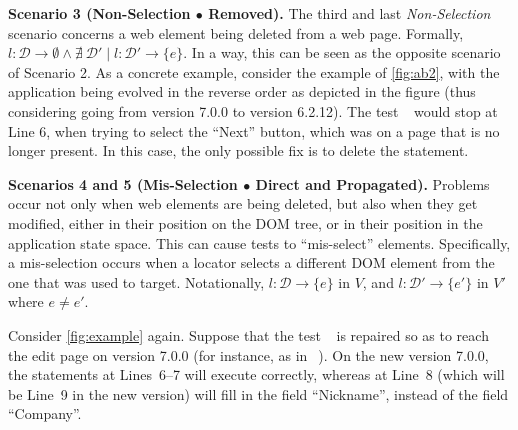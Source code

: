 \noindent
\textbf{Scenario 3 (Non-Selection $\bullet$ Removed).} 
%
The third and last \textit{Non-Selection} scenario concerns a web element being deleted from a web page. Formally, $l: \mathcal{D} \rightarrow \emptyset \land \nexists \ \mathcal{D'} \mid l: \mathcal{D'} \rightarrow \{e\}$.
In a way, this can be seen as the opposite scenario of Scenario 2. 
As a concrete example, consider the example of \autoref{fig:ab2}, with the application being evolved in the reverse order as depicted in the figure (thus considering going from version 7.0.0 to version 6.2.12). The test~\textcircled{} would stop at Line 6, when trying to select the ``Next'' button, which was on a page that is no longer present. In this case, the only possible fix is to delete the statement.


\noindent
\textbf{Scenarios 4 and 5 (Mis-Selection $\bullet$ Direct and Propagated).}\label{sec:misselection}
Problems occur not only when web elements are being deleted, but also when they get modified, either in their position on the DOM tree, or in their position in the application state space. This can cause tests to ``mis-select'' elements.
Specifically, a mis-selection occurs when a locator selects a different DOM element from the one that was used to target. 
Notationally, $l: \mathcal{D} \rightarrow \{e\}$ in $V$, and $l: \mathcal{D}' \rightarrow \{e'\}$ in $V'$ where $e \ne e'$.

Consider \autoref{fig:example} again. 
Suppose that the test~\textcircled{} is repaired so as to reach the edit page on version 7.0.0 (for instance, as in~\textcircled{}). On the new version 7.0.0, the statements at Lines~6--7 will execute correctly, whereas at Line~8 (which will be Line~9 in the new version) will fill in the field ``Nickname'', instead of the field ``Company''.

